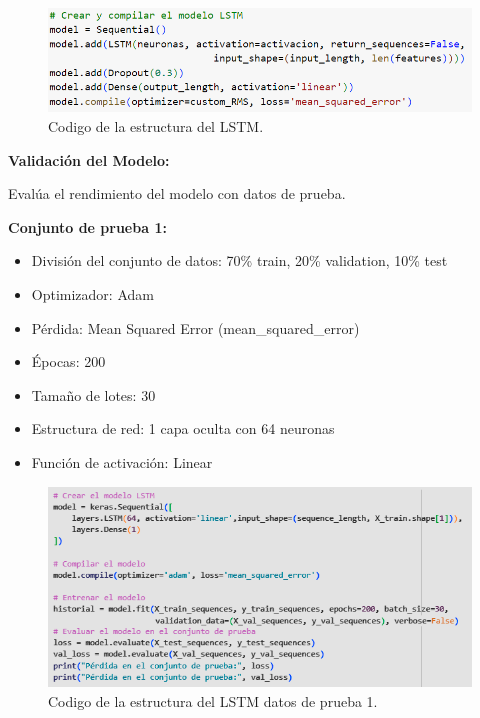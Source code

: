 \begin{figure}[H]
  \begin{center}
    \includegraphics[scale=0.60]{./arquitectura LSTM.png}
    \caption{Codigo de la estructura del LSTM.}
    \label{fig:estructura_lstm}
  \end{center}
\end{figure}

\textbf{Validación del Modelo:}

\vspace{1\baselineskip}

Evalúa el rendimiento del modelo con datos de prueba.

\vspace{1\baselineskip}

\textbf{Conjunto de prueba 1:}
\begin{itemize}
  \item División del conjunto de datos: 70\% train, 20\% validation, 10\% test
  \item Optimizador: Adam
  \item Pérdida: Mean Squared Error (mean\_squared\_error)
  \item Épocas: 200
  \item Tamaño de lotes: 30
  \item Estructura de red: 1 capa oculta con 64 neuronas
  \item Función de activación: Linear
\end{itemize}

\vspace{1\baselineskip}

\begin{figure}[H]
  \begin{center}
    \includegraphics[scale=0.80]{./arqui1ie.png}
    \caption{Codigo de la estructura del LSTM datos de prueba 1.}
    \label{fig:arqui1ie}
  \end{center}
\end{figure}

